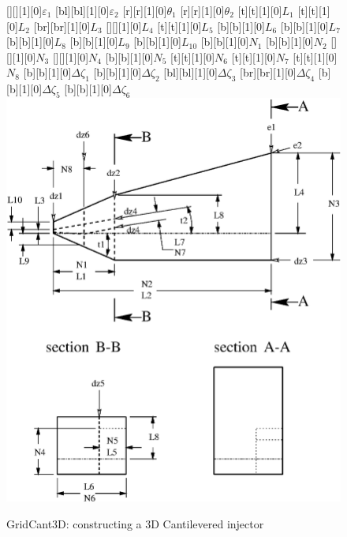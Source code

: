 %
\begin{figure}[h]
\vspace{0.3cm}
   \fontxfig
   [][][1][0]{$\varepsilon_1$}
   [bl][bl][1][0]{$\varepsilon_2$}
   [r][r][1][0]{$\theta_1$}
   [r][r][1][0]{$\theta_2$}
   [t][t][1][0]{$L_1$}
   [t][t][1][0]{$L_2$}
   [br][br][1][0]{$L_3$}
   [][][1][0]{$L_4$}
   [t][t][1][0]{$L_5$}
   [b][b][1][0]{$L_6$}
   [b][b][1][0]{$L_7$}
   [b][b][1][0]{$L_8$}
   [b][b][1][0]{$L_9$}
   [b][b][1][0]{$L_{10}$}
   [b][b][1][0]{$N_1$}
   [b][b][1][0]{$N_2$}
   [][][1][0]{$N_3$}
   [][][1][0]{$N_4$}
   [b][b][1][0]{$N_5$}
   [t][t][1][0]{$N_6$}
   [t][t][1][0]{$N_7$}
   [t][t][1][0]{$N_8$}
   [b][b][1][0]{$\Delta \zeta_1$}
   [b][b][1][0]{$\Delta \zeta_2$}
   [bl][bl][1][0]{$\Delta \zeta_3$}
   [br][br][1][0]{$\Delta \zeta_4$}
   [b][b][1][0]{$\Delta \zeta_5$}
   [b][b][1][0]{$\Delta \zeta_6$}
   \includegraphics[width=6.0in]{gridCant3D.eps}
\caption{GridCant3D: constructing a 3D Cantilevered injector}
\label{fig:gridCant3D}
\end{figure}
%

